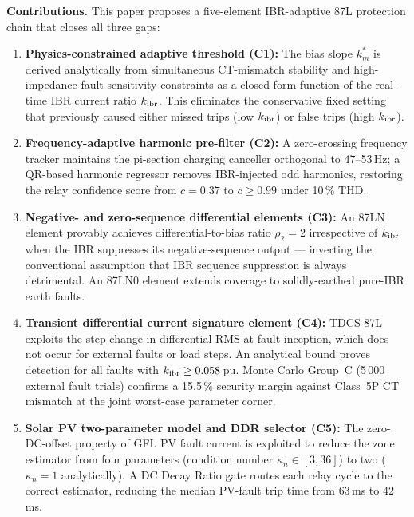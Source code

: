 \documentclass[11pt,a4paper]{article}
\begin{document}
\medskip\noindent\textbf{Contributions.}
This paper proposes a five-element IBR-adaptive 87L protection chain that
closes all three gaps:
\begin{enumerate}
  \item \textbf{Physics-constrained adaptive threshold (C1):}
        The bias slope $k_m^\ast$ is derived analytically from simultaneous
        CT-mismatch stability and high-impedance-fault sensitivity constraints
        as a closed-form function of the real-time IBR current ratio $k_{\rm ibr}$.
        This eliminates the conservative fixed setting that previously caused
        either missed trips (low $k_{\rm ibr}$) or false trips (high
        $k_{\rm ibr}$).

  \item \textbf{Frequency-adaptive harmonic pre-filter (C2):}
        A zero-crossing frequency tracker maintains the pi-section charging
        canceller orthogonal to 47--53\,Hz; a QR-based harmonic regressor
        removes IBR-injected odd harmonics, restoring the relay confidence
        score from $c = 0.37$ to $c \geq 0.99$ under 10\,\% THD.

  \item \textbf{Negative- and zero-sequence differential elements (C3):}
        An 87LN element provably achieves differential-to-bias ratio
        $\rho_2 = 2$ irrespective of $k_{\rm ibr}$ when the IBR suppresses its
        negative-sequence output --- inverting the conventional assumption that
        IBR sequence suppression is always detrimental.
        An 87LN0 element extends coverage to solidly-earthed pure-IBR earth
        faults.

  \item \textbf{Transient differential current signature element (C4):}
        TDCS-87L exploits the step-change in differential RMS at fault
        inception, which does not occur for external faults or load steps.
        An analytical bound proves detection for all faults with
        $k_{\rm ibr} \geq 0.058$\,pu.
        Monte Carlo Group~C (5\,000 external fault trials) confirms a
        15.5\,\% security margin against Class~5P CT mismatch at the
        joint worst-case parameter corner.

  \item \textbf{Solar PV two-parameter model and DDR selector (C5):}
        The zero-DC-offset property of GFL PV fault current is exploited to
        reduce the zone estimator from four parameters (condition number
        $\kappa_n \in [3,36]$) to two ($\kappa_n = 1$ analytically).
        A DC Decay Ratio gate routes each relay cycle to the correct
        estimator, reducing the median PV-fault trip time from 63\,ms to
        42\,ms.
\end{enumerate}
\end{document}
